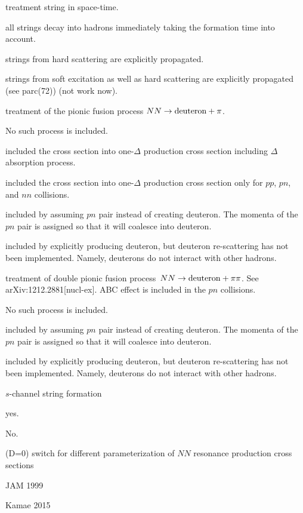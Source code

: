 \documentclass[]{article}
\newenvironment{entry}%
{\begin{list}{}{\setlength{\topsep}{0mm} \setlength{\itemsep}{0mm}
\setlength{\parskip}{0mm} \setlength{\parsep}{0mm}
\setlength{\leftmargin}{20mm} \setlength{\rightmargin}{0mm}
\setlength{\labelwidth}{18mm} \setlength{\labelsep}{2mm}}}%
{\end{list}}
\newenvironment{subentry}%
{\begin{list}{}{\setlength{\topsep}{0mm} \setlength{\itemsep}{0mm}
\setlength{\parskip}{0mm} \setlength{\parsep}{0mm}
\setlength{\leftmargin}{10mm} \setlength{\rightmargin}{0mm}
\setlength{\labelwidth}{18mm} \setlength{\labelsep}{2mm}}}%
{\end{list}}
\newcommand{\itemt}[1]{\item[{\tt #1}\hfill]}
\begin{document}
\begin{entry}
\itemt{mstc(76) (D=0) :} treatment string in space-time.
 \begin{subentry}
  \itemt{$=0$ :} all strings decay into hadrons immediately taking
       the formation time into account. 
 \itemt{$=1$ :} strings from hard scattering
       are explicitly propagated.
 \itemt{$=2$ :} strings from soft excitation as well as hard scattering
       are explicitly propagated (see parc(72)) (not work now).
 \end{subentry}


\itemt{mstc(77) (D=0) :} treatment of the pionic fusion process
$NN\to\rm{deuteron} + \pi$.
 \begin{subentry}
   \itemt{$=0$ :} No such process is included.
   \itemt{$=1$ :} included the cross section into one-$\Delta$ production
   cross section including $\Delta$ absorption process.
   \itemt{$=2$ :} included the cross section into one-$\Delta$ production
   cross section only for $pp$, $pn$, and $nn$ collisions.
   \itemt{$=3$ :} included by assuming $pn$ pair instead of creating deuteron.
   The momenta of the $pn$ pair is assigned so that it will coalesce into
   deuteron.
   \itemt{$=4$ :} included by explicitly producing deuteron, 
    but deuteron re-scattering has not been implemented. 
    Namely, deuterons do not interact with other hadrons.
 \end{subentry}

\itemt{mstc(78) (D=0) :} treatment of double pionic fusion process\
$NN\to\rm{deuteron} + \pi\pi$. 
See arXiv:1212.2881[nucl-ex].  ABC effect is included in the $pn$ collisions.
 \begin{subentry}
   \itemt{$=0$ :} No such process is included.
   \itemt{$=1$ :} included by assuming $pn$ pair instead of creating deuteron.
   The momenta of the $pn$ pair is assigned so that it will coalesce into
   deuteron.
   \itemt{$=4$ :} included by explicitly producing deuteron,
    but deuteron re-scattering has not been implemented. 
    Namely, deuterons do not interact with other hadrons.
 \end{subentry}

\itemt{mstc(79) (D=0) :} $s$-channel string formation
 \begin{subentry}
    \itemt{$=0$ :} yes.
    \itemt{$=1$ :} No.
 \end{subentry}

\itemt{mstc(80) :} (D=0)  switch for different parameterization of
  $NN$ resonance production cross sections
 \begin{subentry}
    \itemt{$=0$ :} JAM 1999
    \itemt{$=1$ :} Kamae 2015
 \end{subentry}


\end{entry}
\end{document}

